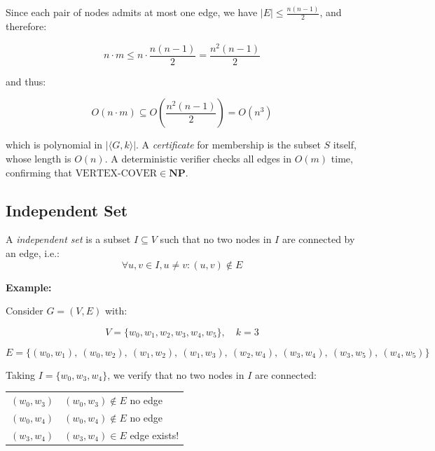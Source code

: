 \documentclass[12pt,a4paper,openany]{article}
\begin{document}
Since each pair of nodes admits at most one edge, we have $|E| \leq \displaystyle\frac{n(n-1)}{2}$, and therefore:

\[
n \cdot m \leq n \cdot \frac{n(n-1)}{2} = \frac{n^2(n-1)}{2}
\]

and thus:

\[
O(n \cdot m) \subseteq O\!\left(\frac{n^2(n-1)}{2}\right) = O(n^3)
\]

which is polynomial in $|\langle G, k \rangle|$. A \emph{certificate} for membership is the subset $S$ itself, whose length is $O(n)$. A deterministic verifier checks all edges in $O(m)$ time, confirming that $\text{VERTEX-COVER} \in \mathbf{NP}$.

\subsection{Independent Set}

A \emph{independent set} is a subset $I \subseteq V$ such that no two nodes in $I$ are connected by an edge, i.e.:
\[
\forall u, v \in I, u \neq v : (u, v) \notin E
\]

\textbf{Example: }

Consider $G = (V, E)$ with:

\begin{center}
\end{center}

\[
V = \{w_0, w_1, w_2, w_3, w_4, w_5\}, \quad k = 3
\]

\[
E = \{(w_0,w_1),\ (w_0,w_2),\ (w_1,w_2),\ (w_1,w_3),\ (w_2,w_4),\ (w_3,w_4),\ (w_3,w_5),\ (w_4,w_5)\}
\]

Taking $I = \{w_0, w_3, w_4\}$, we verify that no two nodes in $I$ are connected:

\begin{center}
\begin{tabular}{ll}
$(w_0, w_3)$ & $(w_0, w_3) \notin E$ \quad no edge \\
$(w_0, w_4)$ & $(w_0, w_4) \notin E$ \quad no edge \\
$(w_3, w_4)$ & $(w_3, w_4) \in E$ \quad edge exists! \\
\end{tabular}
\end{center}
\end{document}
